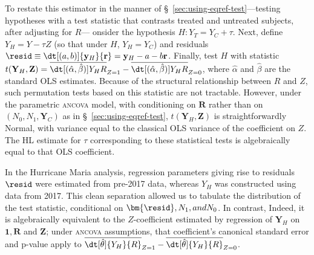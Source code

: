 To restate this estimator in the manner of
\S~\ref{sec:using-eqref-test}---testing hypotheses with a test
statistic that contrasts treated and untreated subjects, after
adjusting for $R$---
onsider the hypothesis $H: Y_{T} = Y_{C} + \tau$.
Next, define ${{Y}_H} = {Y} - \tau {Z}$ (so that under $H$, $Y_H=Y_C$)
and residuals $\resid\equiv\dt[(a, b)]{\mathbf{y}_{H}}{ \mathbf{r}} = {\mathbf{y}_H} - a -
b\mathbf{r}$.
Finally, test $H$ with statistic
$t(\mathbf{Y}_H , \mathbf{Z}) =
\overline{\dt[(\hat{\alpha},\hat{\beta})]{{{Y}_H}}{ {R}}}_{Z=1} -
\overline{\dt[(\hat{\alpha},\hat{\beta})]{{{Y}_H}}{ {R}}}_{Z=0}$,
where $\hat{\alpha}$ and $\hat{\beta}$ are the standard OLS estimates.
Because of the structural relationship
between $R$ and $Z$, such permutation tests based on this statistic
are not tractable. 
However, under the parametric \textsc{ancova} model, with
conditioning on $\mathbf{R}$ rather than on $(N_{0}, N_{1},
\mathbf{Y}_{C})$ as in \S~\ref{sec:using-eqref-test},
$t(\mathbf{Y}_H , \mathbf{Z})$ is straightforwardly Normal, with
variance equal to the classical OLS variance of the coefficient on
$Z$. 
The HL estimate for $\tau$ corresponding to these statistical tests is
algebraically equal to that OLS coefficient. 

In the Hurricane Maria analysis, regression parameters giving rise to
residuals $\resid$ were estimated from pre-2017 data, whereas $Y_H$
was constructed using data from 2017.
This clean separation allowed us to tabulate the distribution of the
test statistic, conditional on $\bm{\resid},N_1, and N_0$.
In contrast, 
 Indeed, it is
algebraically equivalent to the $Z$-coefficient estimated by
regression of ${\mathbf{Y}_H}$ on $\mathbf{1}, \mathbf{R}$ and
$\mathbf{Z}$; under \textsc{ancova} assumptions, that coefficient's
canonical standard error and p-value apply to
$\overline{\dt[\hat\theta]{{{Y}_H}}{ {R}}}_{Z=1} -
\overline{\dt[\hat\theta]{{{Y}_H}}{ {R}}}_{Z=0}$.

